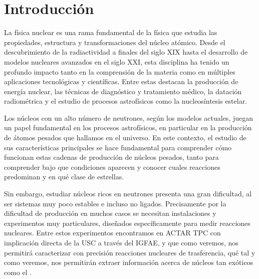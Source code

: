 

\section{Introducción}


La física nuclear es una rama fundamental de la física que estudia las propiedades, estructura y transformaciones del núcleo atómico. Desde el descubrimiento de la radiactividad a finales del siglo XIX hasta el desarrollo de modelos nucleares avanzados en el siglo XXI, esta disciplina ha tenido un profundo impacto tanto en la comprensión de la materia como en múltiples aplicaciones tecnológicas y científicas. Entre estas destacan la producción de energía nuclear, las técnicas de diagnóstico y tratamiento médico, la datación radiométrica y el estudio de procesos astrofísicos como la nucleosíntesis estelar.

Los núcleos con un alto número de neutrones, según los modelos actuales, juegan un papel fundamental en los procesos astrofísicos, en particular en la producción de átomos pesados que hallamos en el universo. En este contexto, el estudio de sus características principales se hace fundamental para comprender cómo funcionan estas cadenas de producción de núcleos pesados, tanto para comprender bajo que condiciones aparecen y conocer cuales reacciones predominan y en qué clase de estrellas.

Sin embargo, estudiar núcleos ricos en neutrones presenta una gran dificultad, al ser sistemas muy poco estables e incluso no ligados. Precisamente por la dificultad de producción en muchos casos se necesitan instalaciones y experimentos muy particulares, diseñados específicamente para medir reacciones nucleares. Entre estos experimentos encontramos en ACTAR TPC con implicación directa de la USC a través del IGFAE, y que como veremos, nos permitirá caracterizar con precisión reacciones nucleares de trasferencia, qué tal y como veremos, nos permitirán extraer información acerca de núcleos tan exóticos como el \litioDiez.

